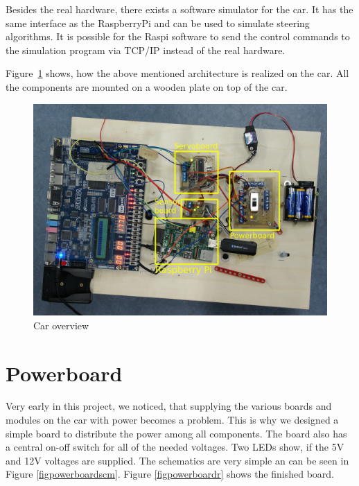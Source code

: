 \documentclass[a4paper
               ,10pt
               ,DIV=10 %
               ,BCOR=0.3cm
               ,pagesize %
               ,headings=small
               ,bibtotoc
               ]
               {scrartcl}
\begin{document}
Besides the real hardware, there exists a software simulator for the car.
It has the same interface as the RaspberryPi and can be used to simulate steering algorithms.
It is possible for the Raspi software to send the control commands to the simulation program via TCP/IP instead of the real hardware.


Figure~\ref{figcaroverview} shows, how the above mentioned architecture is realized on the car. All the components are mounted on a wooden plate on top of the car.
\begin{figure}[H]
\begin{center}
\includegraphics[width=\linewidth]{pic/overview}
\caption{Car overview}
\label{figcaroverview}
\end{center}
\end{figure}

\section{Powerboard}

Very early in this project, we noticed, that supplying the various boards and modules on the car with power becomes a problem.
This is why we designed a simple board to distribute the power among all components.
The board also has a central on-off switch for all of the needed voltages.
Two LEDs show, if the 5V and 12V voltages are supplied.
The schematics are very simple an can be seen in Figure \ref{figpowerboardscm}. Figure \ref{figpowerboardr} shows the finished board.
\end{document}
